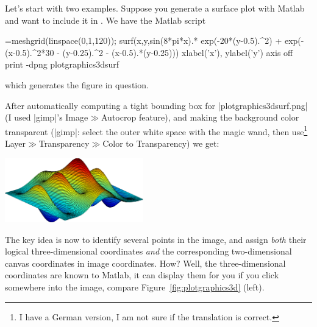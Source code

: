 {{Let's start with two examples. Suppose you generate a surface plot with Matlab
and want to include it in \PGFPlots{}. We have the Matlab script
%
\begin{codeexample}=meshgrid(linspace(0,1,120));
surf(x,y,sin(8*pi*x).* exp(-20*(y-0.5).^2) + exp(-(x-0.5).^2*30 - (y-0.25).^2 - (x-0.5).*(y-0.25)))
xlabel('x'), ylabel('y')
axis off
print -dpng plotgraphics3dsurf
\end{codeexample}
%
\noindent which generates the figure in question.

After automatically computing a tight bounding box for |plotgraphics3dsurf.png|
(I used |gimp|'s Image$\gg$Autocrop feature), and making the background color
transparent (|gimp|: select the outer white space with the magic wand, then
use\footnote{I have a German version, I am not sure if the translation is
correct.} Layer$\gg$Transparency$\gg$Color to Transparency) we get:

\includegraphics[width=6cm]{plotdata/plotgraphics3dsurf.png}

The key idea is now to identify several points in the image, and assign
\emph{both} their logical three-dimensional coordinates \emph{and} the
corresponding two-dimensional canvas coordinates in image coordinates. How?
Well, the three-dimensional coordinates are known to Matlab, it can display
them for you if you click somewhere into the image, compare
Figure~\ref{fig:plotgraphics3d} (left).


}}
